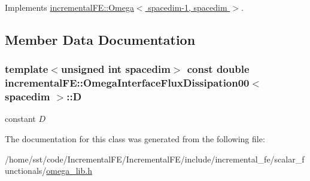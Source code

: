 Implements \hyperlink{classincremental_f_e_1_1_omega_a2f35d862aefa11151de5b7c7411e45df}{incremental\+F\+E\+::\+Omega$<$ spacedim-\/1, spacedim $>$}.



\subsection{Member Data Documentation}
\subsubsection[{\texorpdfstring{D}{D}}]{\setlength{\rightskip}{0pt plus 5cm}template$<$unsigned int spacedim$>$ const double {\bf incremental\+F\+E\+::\+Omega\+Interface\+Flux\+Dissipation00}$<$ spacedim $>$\+::D\hspace{0.3cm}{\ttfamily [private]}}\hypertarget{classincremental_f_e_1_1_omega_interface_flux_dissipation00_ab6efbe2a1c165f99e02c22e4df530d0b}{}\label{classincremental_f_e_1_1_omega_interface_flux_dissipation00_ab6efbe2a1c165f99e02c22e4df530d0b}
constant $D$ 

The documentation for this class was generated from the following file\+:\begin{DoxyCompactItemize}
\item 
/home/sst/code/\+Incremental\+F\+E/\+Incremental\+F\+E/include/incremental\+\_\+fe/scalar\+\_\+functionals/\hyperlink{omega__lib_8h}{omega\+\_\+lib.\+h}\end{DoxyCompactItemize}
